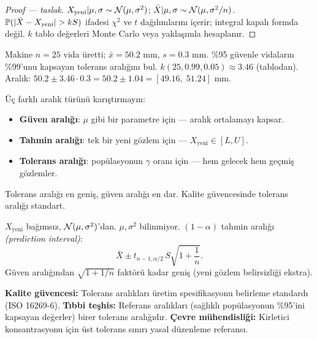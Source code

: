 \begin{proof}[Proof --- taslak]
$X_{\text{yeni}}|\mu,\sigma\sim\mathcal{N}(\mu,\sigma^2)$; $\bar X|\mu,\sigma\sim\mathcal{N}(\mu,\sigma^2/n)$. $\Prob(|\bar X-X_{\text{yeni}}|>kS)$ ifadesi $\chi^2$ ve $t$ dağılımlarını içerir; integral kapalı formda değil. $k$ tablo değerleri Monte Carlo veya yaklaşımla hesaplanır.
\end{proof}

\begin{ornek}
Makine $n=25$ vida üretti; $\bar{x}=50.2$ mm, $s=0.3$ mm. \%95 güvenle vidaların \%99'unu kapsayan tolerans aralığını bul. $k(25,0.99,0.05)\approx3.46$ (tablodan). Aralık: $50.2\pm3.46\cdot0.3=50.2\pm1.04=[49.16,\;51.24]$ mm.
\end{ornek}

\begin{hataanalizi}
Üç farklı aralık türünü karıştırmayın:
\begin{itemize}
  \item \textbf{Güven aralığı}: $\mu$ gibi bir parametre için --- aralık ortalamayı kapsar.
  \item \textbf{Tahmin aralığı}: tek bir yeni gözlem için --- $X_{\text{yeni}}\in[L,U]$.
  \item \textbf{Tolerans aralığı}: popülasyonun $\gamma$ oranı için --- hem gelecek hem geçmiş gözlemler.
\end{itemize}
Tolerans aralığı en geniş, güven aralığı en dar. Kalite güvencesinde tolerans aralığı standart.
\end{hataanalizi}

\begin{teorem}\label{thm:tahmin_aralik}
$X_{\text{yeni}}$ bağımsız, $\mathcal{N}(\mu,\sigma^2)$'dan. $\mu,\sigma^2$ bilinmiyor. $(1-\alpha)$ tahmin aralığı \emph{(prediction interval)}:
\[
  \bar X \pm t_{n-1,\alpha/2}\,S\sqrt{1+\frac{1}{n}}.
\]
Güven aralığından $\sqrt{1+1/n}$ faktörü kadar geniş (yeni gözlem belirsizliği ekstra).
\end{teorem}

\begin{disiplinlerarasibaglan}
\textbf{Kalite güvencesi:} Tolerans aralıkları üretim spesifikasyonu belirleme standardı (ISO 16269-6). \textbf{Tıbbi teşhis:} Referans aralıkları (sağlıklı popülasyonun \%95'ini kapsayan değerler) birer tolerans aralığıdır. \textbf{Çevre mühendisliği:} Kirletici konsantrasyonu için üst tolerans sınırı yasal düzenleme referansı.
\end{disiplinlerarasibaglan}

